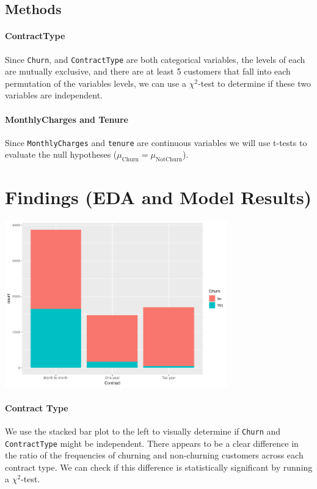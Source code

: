 \documentclass[man, floatsintext]{apa6}
\begin{document}
\subsection{Methods}

\paragraph{ContractType}
Since \texttt{Churn}, and \texttt{ContractType} are both categorical variables, the levels of each are mutually exclusive, and there are at least 5 customers that fall into each permutation of the variables levels, we can use a $\chi^2$-test to determine if these two variables are independent.

\paragraph{MonthlyCharges and Tenure}
 Since \texttt{MonthlyCharges} and \texttt{tenure} are continuous variables we will use t-tests to evaluate the null hypotheses ($\mu_{\text{Churn}} = \mu_{\text{NotChurn}}$).

\section{Findings (EDA and Model Results)}

\hspace{0.5mm}

\noindent\begin{minipage}{0.54\textwidth}
\includegraphics[width = \linewidth, height = 72mm]{CountvsContractTypebyChurn}
\end{minipage}
\hfill
\begin{minipage}{0.42\textwidth}
  \paragraph{Contract Type}
  We use the stacked bar plot to the left to visually determine if \texttt{Churn} and \texttt{ContractType} might be independent. There appears to be a clear difference in the ratio of the frequencies of churning and non-churning customers across each contract type. We can check if this difference is statistically significant by running a $\chi^2$-test.

\end{minipage}
\end{document}
